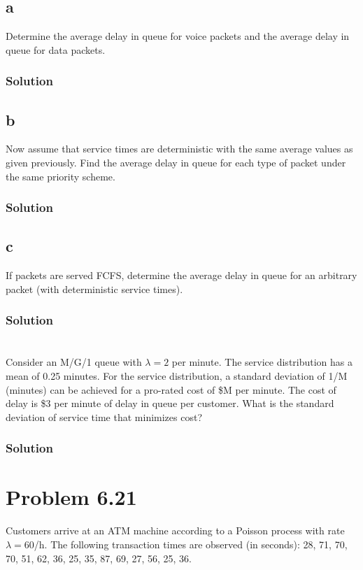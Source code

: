 \documentclass[letterpaper]{amsart}
\begin{document}
\subsection*{a}
Determine the average delay in queue for voice packets and the average
delay in queue for data packets.
\subsubsection*{Solution}
\subsection*{b}
Now assume that service times are deterministic with the same average
values as given previously. Find the average delay in queue for each type
of packet under the same priority scheme.
\subsubsection*{Solution}
\subsection*{c}
If packets are served FCFS, determine the average delay in queue for an
arbitrary packet (with deterministic service times).
\subsubsection*{Solution}

\section{} %
Consider an M/G/1 queue with $\lambda = 2$ per minute. The service distribution has a
mean of 0.25 minutes. For the service distribution, a standard deviation of 1/M
(minutes) can be achieved for a pro-rated cost of \$M per minute. The cost of
delay is \$3 per minute of delay in queue per customer. What is the standard
deviation of service time that minimizes cost?
\subsubsection*{Solution}

\section{Problem 6.21} %
Customers arrive at an ATM machine according to a Poisson process with
rate $\lambda= 60$/h. The following transaction times are observed (in seconds):
28, 71, 70, 70, 51, 62, 36, 25, 35, 87, 69, 27, 56, 25, 36.
\end{document}
